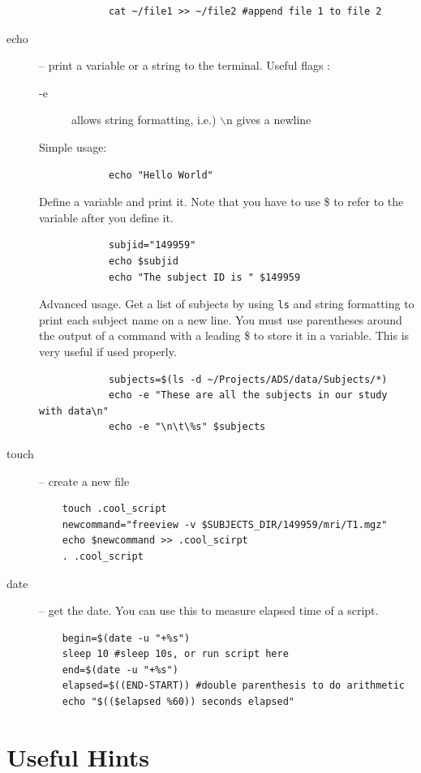 \documentclass[paper=a4, fontsize=11pt]{scrartcl} %
\numberwithin{equation}{section} %
\numberwithin{figure}{section} %
\numberwithin{table}{section} %
\begin{document}
\begin{appendices}
\begin{description}
\begin{lstlisting}
			cat ~/file1 >> ~/file2 #append file 1 to file 2
			\end{lstlisting}							
\item[echo] -- print a variable or a string to the terminal. Useful flags :
			\begin{description}
			\item[-e] allows string formatting, i.e.) $\backslash$n gives a newline
			\end{description}
			Simple usage:
			\begin{lstlisting}
			echo "Hello World"
			\end{lstlisting}
			Define a variable and print it.  Note that you have to use \$ to refer to the variable after you define it.		
			\begin{lstlisting}
			subjid="149959"
			echo $subjid
			echo "The subject ID is " $149959
			\end{lstlisting}						
			Advanced usage.  Get a list of subjects by using \texttt{ls} and string formatting to print each subject name on a new line.  You must use parentheses around the output of a command with a leading \$ to store it in a variable.  This is very useful if used properly.
			\begin{lstlisting}
			subjects=$(ls -d ~/Projects/ADS/data/Subjects/*)
			echo -e "These are all the subjects in our study with data\n" 
			echo -e "\n\t\%s" $subjects
			\end{lstlisting}											
\item[touch] -- create a new file
	\begin{lstlisting}
	touch .cool_script
	newcommand="freeview -v $SUBJECTS_DIR/149959/mri/T1.mgz"
	echo $newcommand >> .cool_scirpt
	. .cool_script
	\end{lstlisting}
\item[date] -- get the date.
	You can use this to measure elapsed time of a script.
	\begin{lstlisting}
	begin=$(date -u "+%s")
	sleep 10 #sleep 10s, or run script here
	end=$(date -u "+%s")
	elapsed=$((END-START)) #double parenthesis to do arithmetic
	echo "$(($elapsed %60)) seconds elapsed"
	\end{lstlisting}
\end{description}

\section{Useful Hints}


\end{appendices}
\end{document}
